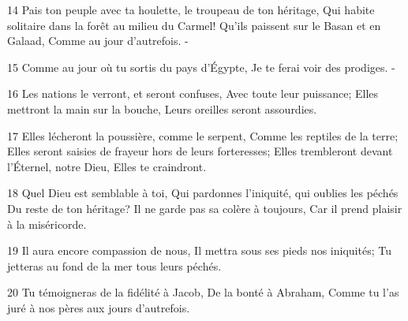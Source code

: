 \par 14 Pais ton peuple avec ta houlette, le troupeau de ton héritage, Qui habite solitaire dans la forêt au milieu du Carmel! Qu'ils paissent sur le Basan et en Galaad, Comme au jour d'autrefois. -
\par 15 Comme au jour où tu sortis du pays d'Égypte, Je te ferai voir des prodiges. -
\par 16 Les nations le verront, et seront confuses, Avec toute leur puissance; Elles mettront la main sur la bouche, Leurs oreilles seront assourdies.
\par 17 Elles lécheront la poussière, comme le serpent, Comme les reptiles de la terre; Elles seront saisies de frayeur hors de leurs forteresses; Elles trembleront devant l'Éternel, notre Dieu, Elles te craindront.
\par 18 Quel Dieu est semblable à toi, Qui pardonnes l'iniquité, qui oublies les péchés Du reste de ton héritage? Il ne garde pas sa colère à toujours, Car il prend plaisir à la miséricorde.
\par 19 Il aura encore compassion de nous, Il mettra sous ses pieds nos iniquités; Tu jetteras au fond de la mer tous leurs péchés.
\par 20 Tu témoigneras de la fidélité à Jacob, De la bonté à Abraham, Comme tu l'as juré à nos pères aux jours d'autrefois.


